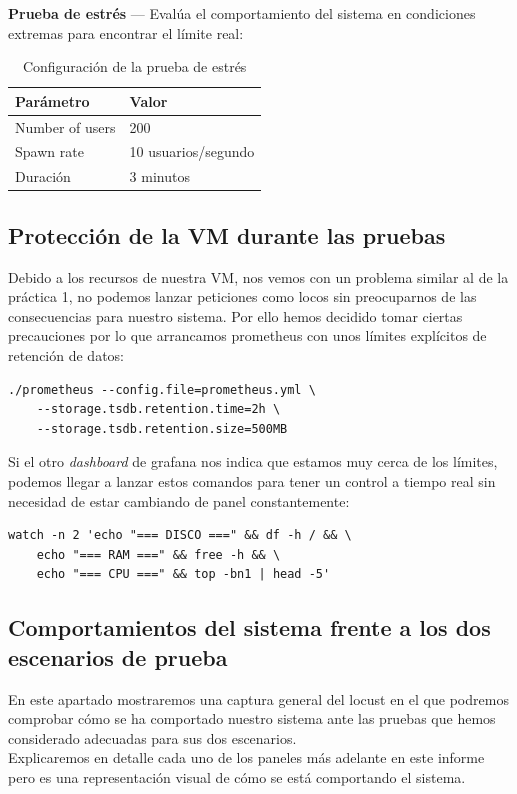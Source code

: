 \documentclass[12pt, a4paper]{article}
\begin{document}
		\textbf{Prueba de estrés} — Evalúa el comportamiento del sistema en
		condiciones extremas para encontrar el límite real:
		
		\begin{table}[H]
			\centering
			\begin{tabular}{ll}
				\toprule
				\textbf{Parámetro} & \textbf{Valor} \\
				\midrule
				Number of users & 200 \\
				Spawn rate      & 10 usuarios/segundo \\
				Duración        & 3 minutos \\
				\bottomrule
			\end{tabular}
			\caption{Configuración de la prueba de estrés}
			\label{estrés}
		\end{table}
		
		\subsection{Protección de la VM durante las pruebas}
		
		Debido a los recursos de nuestra VM, nos vemos con un problema similar al de la práctica 1, no podemos lanzar peticiones como locos sin preocuparnos de las consecuencias para nuestro sistema. Por ello hemos decidido tomar ciertas precauciones por lo que arrancamos prometheus con unos  límites explícitos de retención de datos:
\begin{lstlisting}[style=bash]
	./prometheus --config.file=prometheus.yml \
	--storage.tsdb.retention.time=2h \
	--storage.tsdb.retention.size=500MB
\end{lstlisting}
		
		Si el otro \textit{dashboard} de grafana nos indica que estamos muy cerca de los límites, podemos llegar a lanzar estos comandos para tener un control a tiempo real sin necesidad de estar cambiando de panel constantemente:
		
\begin{lstlisting}[style=bash]
	watch -n 2 'echo "=== DISCO ===" && df -h / && \
	echo "=== RAM ===" && free -h && \
	echo "=== CPU ===" && top -bn1 | head -5'
\end{lstlisting}
	
		\subsection{Comportamientos del sistema frente  a los dos escenarios de prueba}
			En este apartado mostraremos una captura general del locust en el que podremos comprobar cómo se ha comportado nuestro sistema ante las pruebas que hemos considerado adecuadas para sus dos escenarios.\\
			Explicaremos en detalle cada uno de los paneles más adelante en este informe pero es una representación visual de cómo se está comportando el sistema.
\end{document}
